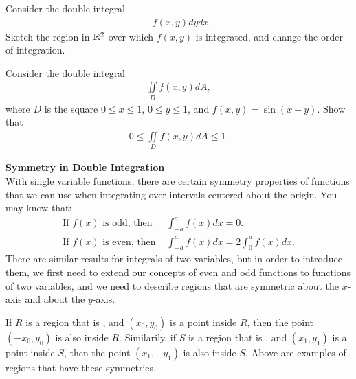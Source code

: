 \documentclass{article}
\begin{document}
\item %
Consider the double integral
\begin{align*}
  \mathop{\int_{0}^{1+e} \! \int_0^{\ln(x-1)}} f(x,y) dydx .
\end{align*}
Sketch the region in $\mathbb{R}^2$ over which $f(x,y)$ is integrated, and change the order of integration.  
\item %
Consider the double integral
\begin{align*}
  \iint\limits_D f(x,y) dA,
\end{align*}
where $D$ is the square $0\le x \le 1$, $0\le y \le 1$, and $f(x,y) = \sin(x+y)$. Show that 
\begin{align*}
  0 \le \iint\limits_D f(x,y) dA \le 1.
\end{align*}
\item %
\textbf{Symmetry in Double Integration} \\
With single variable functions, there are certain symmetry properties of functions that we can use when integrating over intervals centered about the origin. You may know that:
\begin{align*}
  \text{If }f(x)\text{ is odd, then } & \int_{-a}^{a} f(x) dx = 0 . \\
  \text{If }f(x)\text{ is even, then } & \int_{-a}^{a} f(x) dx = 2 \int_0^a f(x) dx.
\end{align*}
There are similar results for integrals of two variables, but in order to introduce them, we first need to extend our concepts of even and odd functions to functions of two variables, and we need to describe regions that are symmetric about the $x$-axis and about the $y$-axis. 

If $R$ is a region that is , and $(x_0,y_0)$ is a point inside $R$, then the point $(-x_0,y_0)$ is also inside $R$. Similarily, if $S$ is a region that is , and $(x_1,y_1)$ is a point inside $S$, then the point $(x_1,-y_1)$ is also inside $S$. Above are examples of regions that have these symmetries.\\
\end{document}
